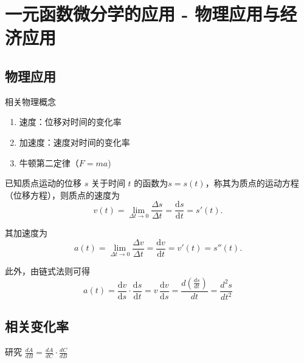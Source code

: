 \documentclass[../book.tex]{subfiles}
\begin{document}
    \section{一元函数微分学的应用 - 物理应用与经济应用}

    \subsection{物理应用}

    相关物理概念
    \begin{enumerate}
        \item 速度：位移对时间的变化率
        \item 加速度：速度对时间的变化率
        \item 牛顿第二定律（$F = ma$)
    \end{enumerate}
    \begin{analysisbox}[Example]
        已知质点运动的位移 $s$ 关于时间 $t$ 的函数为$s = s(t)$，称其为质点的运动方程（位移方程），则质点的速度为
        \[
            v(t)
            = \lim_{\Delta t \to 0} \frac{\Delta s}{\Delta t}
            = \frac{\mathrm{d}s}{\mathrm{d}t}
            = s'(t).
        \]

        其加速度为
        \[
            a(t)
            = \lim_{\Delta t \to 0} \frac{\Delta v}{\Delta t}
            = \frac{\mathrm{d}v}{\mathrm{d}t}
            = v'(t)
            = s''(t).
        \]

        此外，由链式法则可得
        \[
            a(t)
            = \frac{\mathrm{d}v}{\mathrm{d}s}\cdot\frac{\mathrm{d}s}{\mathrm{d}t}
            = v\,\frac{\mathrm{d}v}{\mathrm{d}s}
            = \frac{d(\displaystyle\frac{ds}{dt})}{dt}
            = \frac{d^{2}s}{dt^2}
        \]

    \end{analysisbox}

    \subsection{相关变化率}

    研究 $\displaystyle\frac{dA}{dB} = \displaystyle\frac{dA}{dC}\cdot \displaystyle\frac{dC}{dB}$
\end{document}
